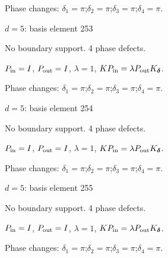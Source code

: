 \par\smallskip\begin{minipage}{.98\linewidth}\small Phase changes: $\delta_{1}=\pi$;\quad $\delta_{2}=\pi$;\quad $\delta_{3}=\pi$;\quad $\delta_{4}=\pi$.\end{minipage}
\vfill
{\footnotesize\texttt{}}
\newpage
{}
{\Large $d=5$: basis element 253}\par
No boundary support. 4 phase defects.
\begin{center}
\end{center}
\vspace{-1mm}
$P_{\rm in}=I$, \quad $P_{\rm out}=I$, \quad $\lambda=1$, \qquad $K P_{\rm in}=\lambda P_{\rm out}K_{\boldsymbol\delta}$.
\par\smallskip\begin{minipage}{.98\linewidth}\small Phase changes: $\delta_{1}=\pi$;\quad $\delta_{2}=\pi$;\quad $\delta_{3}=\pi$;\quad $\delta_{4}=\pi$.\end{minipage}
\vfill
{\footnotesize\texttt{}}
\newpage
{}
{\Large $d=5$: basis element 254}\par
No boundary support. 4 phase defects.
\begin{center}
\end{center}
\vspace{-1mm}
$P_{\rm in}=I$, \quad $P_{\rm out}=I$, \quad $\lambda=1$, \qquad $K P_{\rm in}=\lambda P_{\rm out}K_{\boldsymbol\delta}$.
\par\smallskip\begin{minipage}{.98\linewidth}\small Phase changes: $\delta_{1}=\pi$;\quad $\delta_{2}=\pi$;\quad $\delta_{3}=\pi$;\quad $\delta_{4}=\pi$.\end{minipage}
\vfill
{\footnotesize\texttt{}}
\newpage
{}
{\Large $d=5$: basis element 255}\par
No boundary support. 4 phase defects.
\begin{center}
\end{center}
\vspace{-1mm}
$P_{\rm in}=I$, \quad $P_{\rm out}=I$, \quad $\lambda=1$, \qquad $K P_{\rm in}=\lambda P_{\rm out}K_{\boldsymbol\delta}$.
\par\smallskip\begin{minipage}{.98\linewidth}\small Phase changes: $\delta_{1}=\pi$;\quad $\delta_{2}=\pi$;\quad $\delta_{3}=\pi$;\quad $\delta_{4}=\pi$.\end{minipage}
